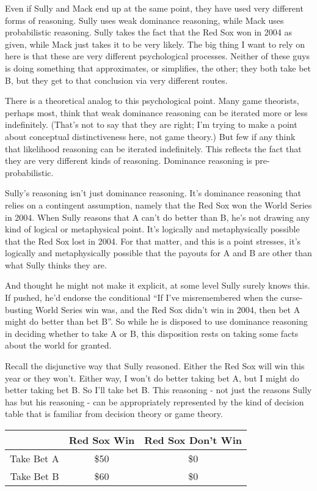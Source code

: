 \documentclass[
  11pt,
]{book}
\begin{document}
Even if Sully and Mack end up at the same point, they have used very different forms of reasoning. Sully uses weak dominance reasoning, while Mack uses probabilistic reasoning. Sully takes the fact that the Red Sox won in 2004 as given, while Mack just takes it to be very likely. The big thing I want to rely on here is that these are very different psychological processes. Neither of these guys is doing something that approximates, or simplifies, the other; they both take bet B, but they get to that conclusion via very different routes.

There is a theoretical analog to this psychological point. Many game theorists, perhaps most, think that weak dominance reasoning can be iterated more or less indefinitely. (That's not to say that they are right; I'm trying to make a point about conceptual distinctiveness here, not game theory.) But few if any think that likelihood reasoning can be iterated indefinitely. This reflects the fact that they are very different kinds of reasoning. Dominance reasoning is pre-probabilistic.

Sully's reasoning isn't just dominance reasoning. It's dominance reasoning that relies on a contingent assumption, namely that the Red Sox won the World Series in 2004. When Sully reasons that A can't do better than B, he's not drawing any kind of logical or metaphysical point. It's logically and metaphysically possible that the Red Sox lost in 2004. For that matter, and this is a point \citet{Ganson2019} stresses, it's logically and metaphysically possible that the payouts for A and B are other than what Sully thinks they are.

And thought he might not make it explicit, at some level Sully surely knows this. If pushed, he'd endorse the conditional ``If I've misremembered when the curse-busting World Series win was, and the Red Sox didn't win in 2004, then bet A might do better than bet B''. So while he is disposed to use dominance reasoning in deciding whether to take A or B, this disposition rests on taking some facts about the world for granted.

Recall the disjunctive way that Sully reasoned. Either the Red Sox will win this year or they won't. Either way, I won't do better taking bet A, but I might do better taking bet B. So I'll take bet B. This reasoning - not just the reasons Sully has but his reasoning - can be appropriately represented by the kind of decision table that is familiar from decision theory or game theory.

\begin{longtable}[]{@{}rcc@{}}
\toprule()
~ & Red Sox Win & Red Sox Don't Win \\
\midrule()
\endhead
Take Bet A & \$50 & \$0 \\
Take Bet B & \$60 & \$0 \\
\bottomrule()
\end{longtable}
\end{document}
